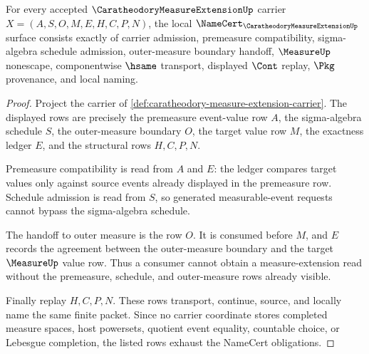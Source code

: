 \begin{theorem}
\label{thm:caratheodory-measure-extension-namecert-obligations}
For every accepted $\CaratheodoryMeasureExtensionUp$ carrier
$X=(A,S,O,M,E,H,C,P,N)$, the local
$\NameCert_{\CaratheodoryMeasureExtensionUp}$ surface consists exactly of
carrier admission, premeasure compatibility, sigma-algebra schedule admission,
outer-measure boundary handoff, $\MeasureUp$ nonescape, componentwise
$\hsame$ transport, displayed $\Cont$ replay, $\Pkg$ provenance, and local
naming.
\end{theorem}
\begin{proof}
Project the carrier of
\autoref{def:caratheodory-measure-extension-carrier}. The displayed rows are
precisely the premeasure event-value row $A$, the sigma-algebra schedule $S$,
the outer-measure boundary $O$, the target value row $M$, the exactness ledger
$E$, and the structural rows $H,C,P,N$.

Premeasure compatibility is read from $A$ and $E$: the ledger compares target
values only against source events already displayed in the premeasure row.
Schedule admission is read from $S$, so generated measurable-event requests
cannot bypass the sigma-algebra schedule.

The handoff to outer measure is the row $O$. It is consumed before $M$, and
$E$ records the agreement between the outer-measure boundary and the target
$\MeasureUp$ value row. Thus a consumer cannot obtain a measure-extension read
without the premeasure, schedule, and outer-measure rows already visible.

Finally replay $H,C,P,N$. These rows transport, continue, source, and locally
name the same finite packet. Since no carrier coordinate stores completed
measure spaces, host powersets, quotient event equality, countable choice, or
Lebesgue completion, the listed rows exhaust the NameCert obligations.
\end{proof}

